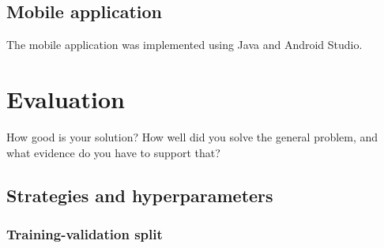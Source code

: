 \documentclass{l4proj}
\begin{document}



\section{Mobile application}

The mobile application was implemented using Java and Android Studio. 



\chapter{Evaluation} 
How good is your solution? How well did you solve the general problem, and what evidence do you have to support that?

\section{Strategies and hyperparameters}

\subsection{Training-validation split}
\label{eval_train_val_split}
\end{document}
